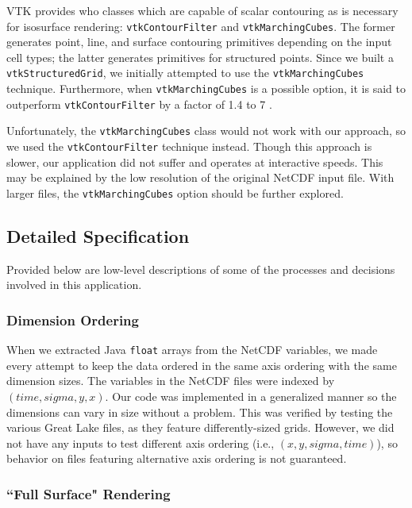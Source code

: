 \documentclass{article} %
\newcommand{\code}[1]{\texttt{#1}}
\begin{document}
VTK provides who classes which are capable of scalar contouring as is necessary for isosurface rendering: \code{vtkContourFilter} and \code{vtkMarchingCubes}.  The former generates point, line, and surface contouring primitives depending on the input cell types; the latter generates primitives for structured points.  Since we built a \code{vtkStructuredGrid}, we initially attempted to use the \code{vtkMarchingCubes} technique.  Furthermore, when \code{vtkMarchingCubes} is a possible option, it is said to outperform \code{vtkContourFilter} by a factor of 1.4 to 7 \cite[p. 181]{vtkGuide}.

Unfortunately, the \code{vtkMarchingCubes} class would not work with our approach, so we used the \code{vtkContourFilter} technique instead.  Though this approach is slower, our application did not suffer and operates at interactive speeds.  This may be explained by the low resolution of the original NetCDF input file.  With larger files, the \code{vtkMarchingCubes} option should be further explored.

\subsection{Detailed Specification}

Provided below are low-level descriptions of some of the processes and decisions involved in this application.

\subsubsection{Dimension Ordering}

When we extracted Java \code{float} arrays from the NetCDF variables, we made every attempt to keep the data ordered in the same axis ordering with the same dimension sizes.  The variables in the NetCDF files were indexed by $(time, sigma, y, x)$.  Our code was implemented in a generalized manner so the dimensions can vary in size without a problem.  This was verified by testing the various Great Lake files, as they feature differently-sized grids.  However, we did not have any inputs to test different axis ordering (i.e., $(x, y, sigma, time)$), so behavior on files featuring alternative axis ordering is not guaranteed. 

\subsubsection{``Full Surface" Rendering}\label{sec:fullLake}
\end{document}
